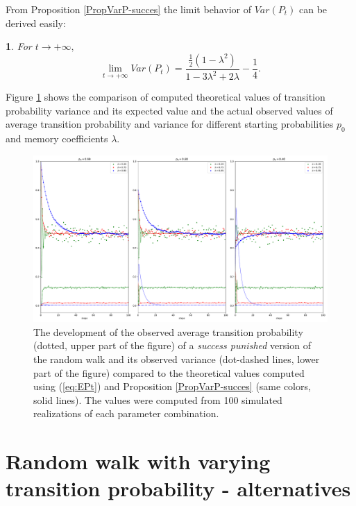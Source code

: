 \documentclass{amsart}
\theoremstyle{definition}
\theoremstyle{plain}
\theoremstyle{plain}
\newtheorem{cor}[thm]{\protect\corollaryname}
\theoremstyle{plain}
\numberwithin{equation}{section}
\providecommand{\corollaryname}{Corollary}
\begin{document}
From Proposition \ref{PropVarP-succes} the limit behavior of $Var(P_{t})$
can be derived easily:

\begin{cor}
For $t\rightarrow+\infty,$ \textup{
\begin{equation}
\lim_{t\to+\infty}Var(P_{t})=\frac{\frac{1}{2}(1-\lambda^{2})}{1-3\lambda^{2}+2\lambda}-\frac{1}{4}.\label{eq:CoroVarpt-statement}
\end{equation}
}
\end{cor}

Figure \ref{fig:The-development-punished} shows the comparison of
computed theoretical values of transition probability variance and
its expected value and the actual observed values of average transition
probability and variance for different starting probabilities $p_{0}$
and memory coefficients $\lambda$.

\begin{figure}
 \begin{center}
\includegraphics[width=1\textwidth]{../simulations/ept_100_walks_100_steps_type_success_punished}
\caption{\label{fig:The-development-punished}The development of the observed
average transition probability (dotted, upper part of the figure)
of a \emph{success punished} version of the random walk and its observed
variance (dot-dashed lines, lower part of the figure) compared to
the theoretical values computed using (\ref{eq:EPt}) and Proposition
\ref{PropVarP-succes} (same colors, solid lines). The values were
computed from 100 simulated realizations of each parameter combination.}
 \end{center}
\end{figure}

\section{Random walk with varying transition probability - alternatives\label{sec:Random-walk-aternatives}}
\end{document}
